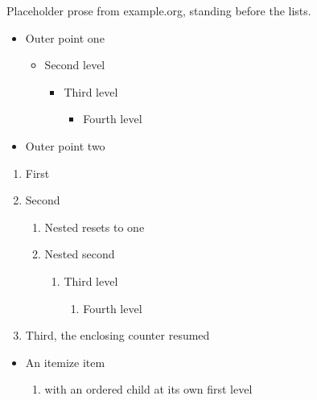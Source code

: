 \documentclass{article}
\begin{document}
Placeholder prose from example.org, standing before the lists.

\begin{itemize}
\item Outer point one
  \begin{itemize}
  \item Second level
    \begin{itemize}
    \item Third level
      \begin{itemize}
      \item Fourth level
      \end{itemize}
    \end{itemize}
  \end{itemize}
\item Outer point two
\end{itemize}

\begin{enumerate}
\item First
\item Second
  \begin{enumerate}
  \item Nested resets to one
  \item Nested second
    \begin{enumerate}
    \item Third level
      \begin{enumerate}
      \item Fourth level
      \end{enumerate}
    \end{enumerate}
  \end{enumerate}
\item Third, the enclosing counter resumed
\end{enumerate}

\begin{itemize}
\item An itemize item
  \begin{enumerate}
  \item with an ordered child at its own first level
  \end{enumerate}
\end{itemize}
\end{document}
